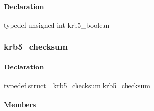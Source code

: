 \documentclass[letterpaper,10pt,english]{sphinxmanual}
\begin{document}
\paragraph{Declaration}
\label{appdev/refs/types/krb5_boolean:declaration}
typedef unsigned int krb5\_boolean


\subsubsection{krb5\_checksum}
\label{appdev/refs/types/krb5_checksum::doc}\label{appdev/refs/types/krb5_checksum:krb5-checksum}\label{appdev/refs/types/krb5_checksum:krb5-checksum-struct}

\begin{fulllineitems}
\label{appdev/refs/types/krb5_checksum:krb5_checksum}
\end{fulllineitems}



\paragraph{Declaration}
\label{appdev/refs/types/krb5_checksum:declaration}
typedef struct \_krb5\_checksum  krb5\_checksum


\paragraph{Members}
\label{appdev/refs/types/krb5_checksum:members}

\begin{fulllineitems}
\label{appdev/refs/types/krb5_checksum:krb5_checksum.magic}
\end{fulllineitems}


\begin{fulllineitems}
\label{appdev/refs/types/krb5_checksum:krb5_checksum.checksum_type}
\end{fulllineitems}


\begin{fulllineitems}
\label{appdev/refs/types/krb5_checksum:krb5_checksum.length}
\end{fulllineitems}
\end{document}
